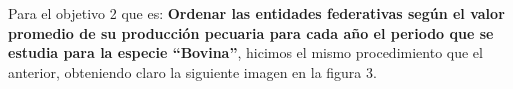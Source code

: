 \item Para el objetivo 2 que es: {\bfseries Ordenar las entidades federativas según el valor promedio de su producción pecuaria para cada año el periodo que se estudia para la especie “Bovina”}, hicimos el mismo procedimiento que el anterior, obteniendo claro la siguiente imagen en la figura 3.
